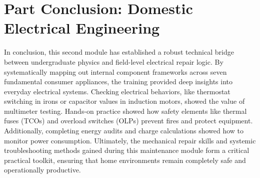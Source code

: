 \documentclass[11pt,a4paper]{report}
\begin{document}
\chapter*{Part Conclusion: Domestic Electrical Engineering}
In conclusion, this second module has established a robust technical bridge between undergraduate physics and field-level electrical repair logic. By systematically mapping out internal component frameworks across seven fundamental consumer appliances, the training provided deep insights into everyday electrical systems. Checking electrical behaviors, like thermostat switching in irons or capacitor values in induction motors, showed the value of multimeter testing. Hands-on practice showed how safety elements like thermal fuses (TCOs) and overload switches (OLPs) prevent fires and protect equipment. Additionally, completing energy audits and charge calculations showed how to monitor power consumption. Ultimately, the mechanical repair skills and systemic troubleshooting methods gained during this maintenance module form a critical practical toolkit, ensuring that home environments remain completely safe and operationally productive.
\end{document}
